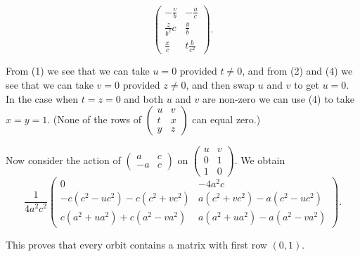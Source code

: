 \documentclass[12pt]{article}
\begin{document}
\begin{equation}
\allowbreak \left( 
\begin{array}{cc}
-\frac{v}{b} & -\frac{u}{c} \\ 
\frac{z}{b^{2}}c & \frac{y}{b} \\ 
\frac{x}{c} & t\frac{b}{c^{2}}%
\end{array}%
\right) .
\end{equation}

\bigskip From (1) we see that we can take $u=0$ provided $t\neq 0$, and from
(2) and (4) we see that we can take $v=0$ provided $z\neq 0$, and then swap $%
u$ and $v$ to get $u=0$. In the case when $t=z=0$ and both $u$ and $v$ are
non-zero we can use (4) to take $x=y=1$. (None of the rows of $\left( 
\begin{array}{ll}
u & v \\ 
t & x \\ 
y & z%
\end{array}%
\right) $ can equal zero.)

Now consider the action of $\left( 
\begin{array}{ll}
a & c \\ 
-a & c%
\end{array}%
\right) $ on $\left( 
\begin{array}{ll}
u & v \\ 
0 & 1 \\ 
1 & 0%
\end{array}%
\right) $. We obtain%
\[
\allowbreak \frac{1}{4a^{2}c^{2}}\left( 
\begin{array}{cc}
0 & -4a^{2}c \\ 
-c\left( c^{2}-uc^{2}\right) -c\left( c^{2}+vc^{2}\right)  & a\left(
c^{2}+vc^{2}\right) -a\left( c^{2}-uc^{2}\right)  \\ 
c\left( a^{2}+ua^{2}\right) +c\left( a^{2}-va^{2}\right)  & a\left(
a^{2}+ua^{2}\right) -a\left( a^{2}-va^{2}\right) 
\end{array}%
\right) .
\]

This proves that every orbit contains a matrix with first row $(0,1)$.
\end{document}

